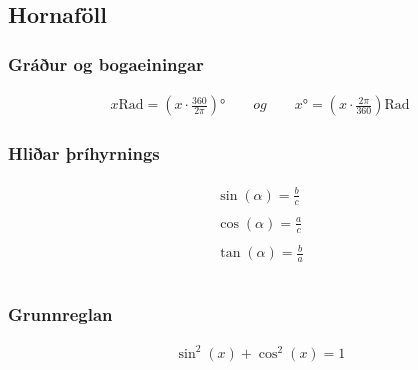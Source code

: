 \documentclass[a4paper,10pt,icelandic]{sphinxmanual}
\begin{document}
\subsection{Hornaföll}
\label{\detokenize{Kafli12:hornafoll}}

\subsubsection{Gráður og bogaeiningar}
\label{\detokenize{Kafli12:graur-og-bogaeiningar}}\begin{equation*}
\begin{split}x \text{Rad} = \left(x \cdot \frac{360}{2 \pi}\right)° \qquad og \qquad  x°=\left( x \cdot \frac{2 \pi}{360}\right) \text{Rad}\end{split}
\end{equation*}

\subsubsection{Hliðar þríhyrnings}
\label{\detokenize{Kafli12:hliar-rihyrnings}}\begin{equation*}
\begin{split}\begin{aligned}
\sin(\alpha) = \frac{b}{c} \\
\qquad \\
\cos(\alpha) = \frac{a}{c} \\
\qquad \\
\tan(\alpha) = \frac{b}{a} \\
\qquad \\
\end{aligned}\end{split}
\end{equation*}


\subsubsection{Grunnreglan}
\label{\detokenize{Kafli12:grunnreglan}}\begin{equation*}
\begin{split}\sin^2(x) + \cos^2(x) = 1\end{split}
\end{equation*}
\end{document}
